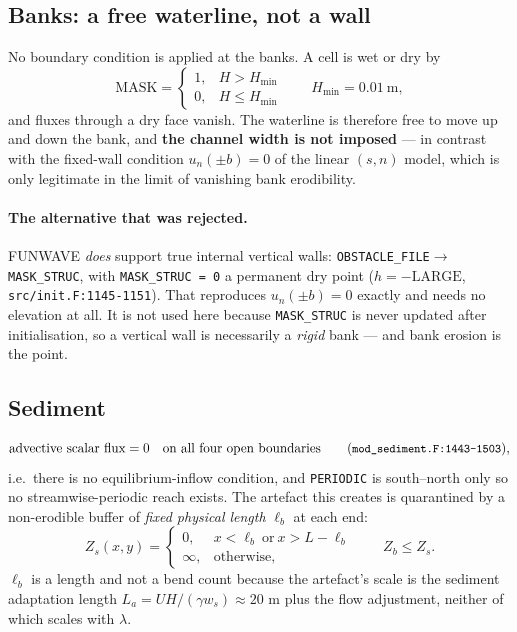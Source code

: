 \documentclass[11pt,a4paper]{article}
\newcommand{\code}[1]{\texttt{\small #1}}
\begin{document}
\subsection{Banks: a free waterline, not a wall}
No boundary condition is applied at the banks. A cell is wet or dry by
\begin{equation}
  \mathrm{MASK}=
  \begin{cases} 1, & H>H_{\min}\\ 0, & H\le H_{\min}\end{cases}
  \qquad H_{\min}=0.01\ \mathrm{m},
  \label{eq:wetdry}
\end{equation}
and fluxes through a dry face vanish. The waterline is therefore free to move up and down
the bank, and \textbf{the channel width is not imposed} --- in contrast with the fixed-wall
condition $u_n(\pm b)=0$ of the linear $(s,n)$ model, which is only legitimate in the
limit of vanishing bank erodibility.

\paragraph{The alternative that was rejected.} FUNWAVE \emph{does} support true internal
vertical walls: \code{OBSTACLE\_FILE}$\to$\code{MASK\_STRUC}, with
\code{MASK\_STRUC = 0} a permanent dry point ($h=-\text{LARGE}$,
\code{src/init.F:1145-1151}). That reproduces $u_n(\pm b)=0$ exactly and needs no
elevation at all. It is not used here because \code{MASK\_STRUC} is never updated after
initialisation, so a vertical wall is necessarily a \emph{rigid} bank --- and bank erosion
is the point.

\subsection{Sediment}
\begin{equation}
  \text{advective scalar flux}=0 \quad\text{on all four open boundaries}
  \qquad(\code{mod\_sediment.F:1443-1503}),
\end{equation}
i.e.\ there is no equilibrium-inflow condition, and \code{PERIODIC} is south--north only
so no streamwise-periodic reach exists. The artefact this creates is quarantined by a
non-erodible buffer of \emph{fixed physical length} $\ell_b$ at each end:
\begin{equation}
  Z_s(x,y)=\begin{cases} 0, & x<\ell_b \ \text{or}\ x>L-\ell_b\\ \infty, & \text{otherwise,}\end{cases}
  \qquad Z_b \le Z_s .
  \label{eq:hardbottom}
\end{equation}
$\ell_b$ is a length and not a bend count because the artefact's scale is the sediment
adaptation length $L_a=UH/(\gamma w_s)\approx 20$ m plus the flow adjustment, neither of
which scales with $\lambda$.
\end{document}
